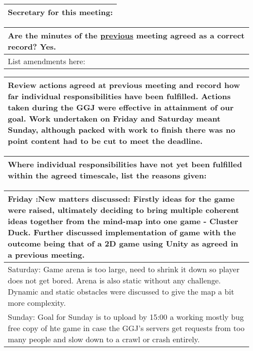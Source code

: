 \documentclass{article}
\begin{document}
\begin{table}[H]
	\centering
	\begin{tabular}{| p{12cm}  |}
	\hline
	Secretary for this meeting:   \\ \hline
\end{tabular}
\end{table}

\begin{table}[H]
	\centering
	\begin{tabular}{| p{12cm}  |}
	\hline
	Are the minutes of the \underline{previous} meeting agreed as a correct record? Yes.\\ \hline
	List amendments here: \\ \hline
\end{tabular}
\end{table}

\begin{table}[H]
	\centering
	\begin{tabular}{| p{12cm}  |}
	\hline
	Review actions agreed at previous meeting and record how far individual responsibilities have been fulfilled. Actions taken during the GGJ were effective in attainment of our goal. Work undertaken on Friday and Saturday meant Sunday, although packed with work to finish there was no point content had to be cut to meet the deadline.\\ \hline
\end{tabular}
\end{table}

\begin{table}[H]
	\centering
	\begin{tabular}{| p{12cm}  |}
	\hline
	Where individual responsibilities have not yet been fulfilled within the agreed timescale, list the reasons given: \\ \hline
\end{tabular}
\end{table}

\begin{table}[H]
	\centering
	\begin{tabular}{| p{12cm}  |}
	\hline
	Friday :New matters discussed: Firstly ideas for the game were raised, ultimately deciding to bring multiple coherent ideas together from the mind-map into one game - Cluster Duck. Further discussed implementation of game with the outcome being that of a 2D game using Unity as agreed in a previous meeting.\\ \hline
	
	Saturday: Game arena is too large, need to shrink it down so player does not get bored. Arena is also static without any challenge. Dynamic and static obstacles were discussed to give the map a bit more complexity.\\ \hline
	
	Sunday: Goal for Sunday is to upload by 15:00 a working mostly bug free copy of hte game in case the GGJ's servers get requests from too many people and slow down to a crawl or crash entirely.\\ \hline 
\end{tabular}
\end{table}
\end{document}
